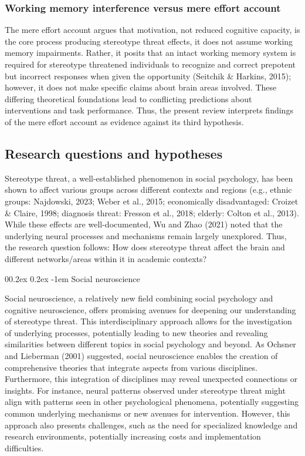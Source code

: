 \documentclass[
  stu, a4paper, 12pt,mask,floatsintext]{apa7}
\makeatletter
\let\oldparagraph\paragraph
\renewcommand{\paragraph}[1]{\oldparagraph{#1}\mbox{}}
\renewcommand{\paragraph}{\@startsection{paragraph}{4}{\parindent}%
  {0\baselineskip \@plus 0.2ex \@minus 0.2ex}%
  {-1em}%
  {\normalfont\normalsize\bfseries\itshape\typesectitle}}
\renewcommand{\paragraph}{\@startsection{paragraph}{4}{\parindent}%
  {0\baselineskip \@plus 0.2ex \@minus 0.2ex}%
  {-1em}%
  {\normalfont\normalsize\bfseries\typesectitle}}
\makeatother
\begin{document}
\subsubsection{Working memory interference versus mere effort account}\label{working-memory-interference-versus-mere-effort-account}

The mere effort account argues that motivation, not reduced cognitive capacity, is the core process producing stereotype threat effects, it does not assume working memory impairments.
Rather, it posits that an intact working memory system is required for stereotype threatened individuals to recognize and correct prepotent but incorrect responses when given the opportunity (Seitchik \& Harkins, 2015); however, it does not make specific claims about brain areas involved.
These differing theoretical foundations lead to conflicting predictions about interventions and task performance.
Thus, the present review interprets findings of the mere effort account as evidence against its third hypothesis.

\subsection{Research questions and hypotheses}\label{research-questions-and-hypotheses}

Stereotype threat, a well-established phenomenon in social psychology, has been shown to affect various groups across different contexts and regions (e.g., ethnic groups: Najdowski, 2023; Weber et al., 2015; economically disadvantaged: Croizet \& Claire, 1998; diagnosis threat: Fresson et al., 2018; elderly: Colton et al., 2013).
While these effects are well-documented, Wu and Zhao (2021) noted that the underlying neural processes and mechanisms remain largely unexplored.
Thus, the research question follows: How does stereotype threat affect the brain and different networks/areas within it in academic contexts?

\paragraph{Social neuroscience}\label{social-neuroscience}

Social neuroscience, a relatively new field combining social psychology and cognitive neuroscience, offers promising avenues for deepening our understanding of stereotype threat.
This interdisciplinary approach allows for the investigation of underlying processes, potentially leading to new theories and revealing similarities between different topics in social psychology and beyond. As Ochsner and Lieberman (2001) suggested, social neuroscience enables the creation of comprehensive theories that integrate aspects from various disciplines.
Furthermore, this integration of disciplines may reveal unexpected connections or insights. For instance, neural patterns observed under stereotype threat might align with patterns seen in other psychological phenomena, potentially suggesting common underlying mechanisms or new avenues for intervention.
However, this approach also presents challenges, such as the need for specialized knowledge and research environments, potentially increasing costs and implementation difficulties.
\end{document}
